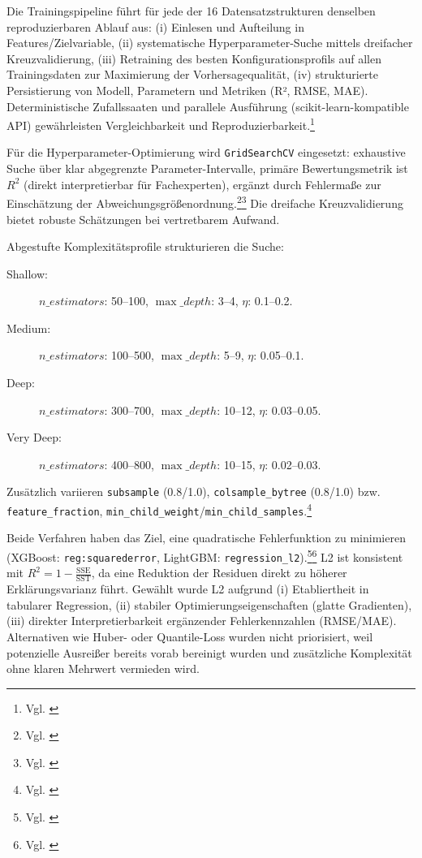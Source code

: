 Die Trainingspipeline führt für jede der 16 Datensatzstrukturen denselben reproduzierbaren Ablauf aus: (i) Einlesen und Aufteilung in Features/Zielvariable, (ii) systematische Hyperparameter-Suche mittels dreifacher Kreuzvalidierung, (iii) Retraining des besten Konfigurationsprofils auf allen Trainingsdaten zur Maximierung der Vorhersagequalität, (iv) strukturierte Persistierung von Modell, Parametern und Metriken (R², RMSE, MAE). Deterministische Zufallssaaten und parallele Ausführung (scikit-learn-kompatible API) gewährleisten Vergleichbarkeit und Reproduzierbarkeit.\footnote{Vgl. \cite{Pedregosa2011ScikitLearn}}

Für die Hyperparameter-Optimierung wird \texttt{GridSearchCV} eingesetzt: exhaustive Suche über klar abgegrenzte Parameter-Intervalle, primäre Bewertungsmetrik ist $R^2$ (direkt interpretierbar für Fachexperten), ergänzt durch Fehlermaße zur Einschätzung der Abweichungsgrößenordnung.\footnote{Vgl. \cite{Bengio2012GridSearch}}\footnote{Vgl. \cite{Pedregosa2011ScikitLearn}} Die dreifache Kreuzvalidierung bietet robuste Schätzungen bei vertretbarem Aufwand.

Abgestufte Komplexitätsprofile strukturieren die Suche:
\begin{description}
  \item[Shallow:] $n\_estimators$: 50–100, $\max\_depth$: 3–4, $\eta$: 0.1–0.2.
  \item[Medium:] $n\_estimators$: 100–500, $\max\_depth$: 5–9, $\eta$: 0.05–0.1.
  \item[Deep:] $n\_estimators$: 300–700, $\max\_depth$: 10–12, $\eta$: 0.03–0.05.
  \item[Very Deep:] $n\_estimators$: 400–800, $\max\_depth$: 10–15, $\eta$: 0.02–0.03.
\end{description}
Zusätzlich variieren \texttt{subsample} (0.8/1.0), \texttt{colsample\_bytree} (0.8/1.0) bzw. \texttt{feature\_fraction}, \texttt{min\_child\_weight}/\texttt{min\_child\_samples}.\footnote{Vgl. \cite{Ke2017LightGBM}}

Beide Verfahren haben das Ziel, eine quadratische Fehlerfunktion zu minimieren (XGBoost: \texttt{reg:squarederror}, LightGBM: \texttt{regression\_l2}).\footnote{Vgl. \cite{Chen2016XGBoost}}\footnote{Vgl. \cite{Ke2017LightGBM}} L2 ist konsistent mit $R^2 = 1 - \tfrac{\text{SSE}}{\text{SST}}$, da eine Reduktion der Residuen direkt zu höherer Erklärungsvarianz führt. Gewählt wurde L2 aufgrund (i) Etabliertheit in tabularer Regression, (ii) stabiler Optimierungseigenschaften (glatte Gradienten), (iii) direkter Interpretierbarkeit ergänzender Fehlerkennzahlen (RMSE/MAE). Alternativen wie Huber- oder Quantile-Loss wurden nicht priorisiert, weil potenzielle Ausreißer bereits vorab bereinigt wurden und zusätzliche Komplexität ohne klaren Mehrwert vermieden wird.

